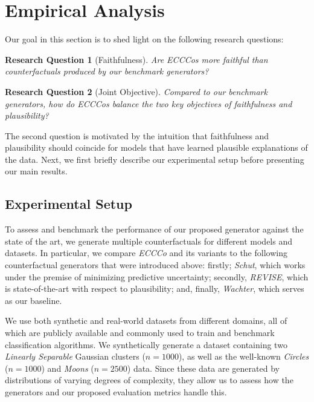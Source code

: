 \documentclass{article}
\newtheorem{question}{Research Question}[section]
\begin{document}
\section{Empirical Analysis}\label{emp}

Our goal in this section is to shed light on the following research questions:

\begin{question}[Faithfulness]\label{rq:faithfulness}
  Are ECCCos more faithful than counterfactuals produced by our benchmark generators?
\end{question}

\begin{question}[Joint Objective]\label{rq:plausibility}
  Compared to our benchmark generators, how do ECCCos balance the two key objectives of faithfulness and plausibility?
\end{question}

The second question is motivated by the intuition that faithfulness and plausibility should coincide for models that have learned plausible explanations of the data. Next, we first briefly describe our experimental setup before presenting our main results.

\subsection{Experimental Setup}

To assess and benchmark the performance of our proposed generator against the state of the art, we generate multiple counterfactuals for different models and datasets. In particular, we compare \textit{ECCCo} and its variants to the following counterfactual generators that were introduced above: firstly; \textit{Schut}, which works under the premise of minimizing predictive uncertainty; secondly, \textit{REVISE}, which is state-of-the-art with respect to plausibility; and, finally, \textit{Wachter}, which serves as our baseline. 

We use both synthetic and real-world datasets from different domains, all of which are publicly available and commonly used to train and benchmark classification algorithms. We synthetically generate a dataset containing two \textit{Linearly Separable} Gaussian clusters ($n=1000$), as well as the well-known \textit{Circles} ($n=1000$) and \textit{Moons} ($n=2500$) data. Since these data are generated by distributions of varying degrees of complexity, they allow us to assess how the generators and our proposed evaluation metrics handle this.
\end{document}
